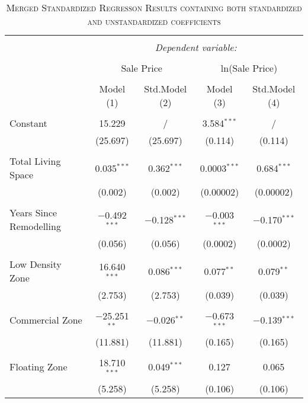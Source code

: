 \documentclass[a4paper]{article}
\begin{document}
\begin{table}[!htbp] \centering 
\begin{adjustwidth}{-0.0cm}{-0cm}
\begin{threeparttable}
\small
\captionsetup{font=small, justification=raggedright,singlelinecheck=false}
\caption{\textsc{Merged Standardized Regresson Results containing both standardized and unstandardized coefficients}}
\centering 
  \label{}
\small 
\begin{tabular}{@{\extracolsep{-1pt}}lcccc} 
\\[-5.8ex]\hline 
\hline \\[-1.8ex] 
 & \multicolumn{4}{c}{\textit{Dependent variable:}} \\ 
\cline{2-5} 
\\[-1.8ex] & \multicolumn{2}{c}{Sale Price} & \multicolumn{2}{c}{ln(Sale Price)} \\ 
\\[-1.8ex] & Model (1) & Std.Model (2) & Model (3) & Std.Model (4)\\ 
\hline \\[-1.8ex] 
 Constant & 15.229 & / & 3.584$^{***}$ & / \\ 
  & (25.697) & (25.697) & (0.114) & (0.114) \\ 
  & & & & \\ 
 Total Living Space & 0.035$^{***}$ & 0.362$^{***}$ & 0.0003$^{***}$ & 0.684$^{***}$ \\ 
  & (0.002) & (0.002) & (0.00002) & (0.00002) \\ 
  & & & & \\ 
 Years Since Remodelling & $-$0.492$^{***}$ & $-$0.128$^{***}$ & $-$0.003$^{***}$ & $-$0.170$^{***}$ \\ 
  & (0.056) & (0.056) & (0.0002) & (0.0002) \\ 
  & & & & \\ 
 Low Density Zone & 16.640$^{***}$ & 0.086$^{***}$ & 0.077$^{**}$ & 0.079$^{**}$ \\ 
  & (2.753) & (2.753) & (0.039) & (0.039) \\ 
  & & & & \\ 
 Commercial Zone & $-$25.251$^{**}$ & $-$0.026$^{**}$ & $-$0.673$^{***}$ & $-$0.139$^{***}$ \\ 
  & (11.881) & (11.881) & (0.165) & (0.165) \\ 
  & & & & \\ 
 Floating Zone & 18.710$^{***}$ & 0.049$^{***}$ & 0.127 & 0.065 \\ 
  & (5.258) & (5.258) & (0.106) & (0.106) \\ 

\end{tabular}
\end{threeparttable}
\end{adjustwidth}
\end{table}
\end{document}
